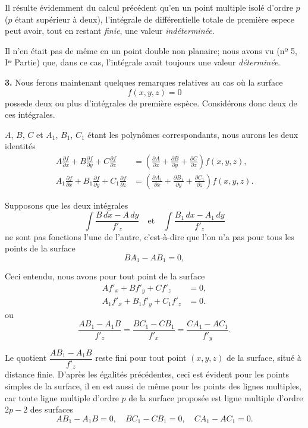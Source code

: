 \documentclass{article}
\begin{document}
Il résulte évidemment du calcul précédent qu'en un point multiple isolé d'ordre $p$ ($p$ étant supérieur à deux), l'intégrale de différentielle totale de première espece peut avoir, tout en restant \emph{finie}, une valeur \emph{indéterminée}.

Il n'en était pas de même en un point double non planaire; nous avons vu (nº 5, Iʳᵉ Partie) que, dans ce cas, l'intégrale avait toujours une valeur \emph{déterminée}.

\textbf{3.} Nous ferons maintenant quelques remarques relatives au cas où la surface
\[
f(x, y, z) = 0
\]
possede deux ou plus d'intégrales de première espèce. Considérons donc deux de ces intégrales.

$A$, $B$, $C$ et $A_{1}$, $B_{1}$, $C_{1}$ étant les polynômes correspondants, nous aurons les deux identités
\[
\begin{aligned}
A \frac{\partial f}{\partial x} + B \frac{\partial f}{\partial y} + C \frac{\partial f}{\partial z} &= \left( \frac{\partial A}{\partial x} + \frac{\partial B}{\partial y} + \frac{\partial C}{\partial z} \right) f(x, y, z), \\
A_{1} \frac{\partial f}{\partial x} + B_{1} \frac{\partial f}{\partial y} + C_{1} \frac{\partial f}{\partial z} &= \left( \frac{\partial A_{1}}{\partial x} + \frac{\partial B_{1}}{\partial y} + \frac{\partial C_{1}}{\partial z} \right) f(x, y, z).
\end{aligned}
\]

Supposons que les deux intégrales
\[
\int \frac{B\,dx - A\,dy}{f'_{z}} \quad \text{et} \quad \int \frac{B_{1}\,dx - A_{1}\,dy}{f'_{z}}
\]
ne sont pas fonctions l'une de l'autre, c'est-à-dire que l'on n'a pas pour tous les points de la surface
\[
BA_{1} - AB_{1} = 0,
\]

Ceci entendu, nous avons pour tout point de la surface
\[
\begin{aligned}
A f'_{x} + B f'_{y} + C f'_{z} &= 0, \\
A_{1} f'_{x} + B_{1} f'_{y} + C_{1} f'_{z} &= 0.
\end{aligned}
\]
ou
\[
\frac{AB_{1} - A_{1}B}{f'_{z}} = \frac{BC_{1} - CB_{1}}{f'_{x}} = \frac{CA_{1} - AC_{1}}{f'_{y}}. \tag{1}
\]

Le quotient $\dfrac{AB_{1} - A_{1}B}{f'_{z}}$ reste fini pour tout point $(x, y, z)$ de la surface, situé à distance finie. D'après les égalités précédentes, ceci est évident pour les points simples de la surface, il en est aussi de même pour les points des lignes multiples, car toute ligne multiple d'ordre $p$ de la surface proposée est ligne multiple d'ordre $2p - 2$ des surfaces
\[
AB_{1} - A_{1}B = 0, \quad BC_{1} - CB_{1} = 0, \quad CA_{1} - AC_{1} = 0.
\]
\end{document}
